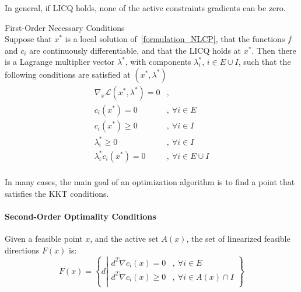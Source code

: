 In general, if LICQ holds, none of the active constraints gradients can be zero.

\begin{theorem}{First-Order Necessary Conditions}\\
\label{KKT_conditions}
  Suppose that $x^*$ is a local solution of~\ref{formulation_NLCP}, that the functions $f$ and $c_i$ are continuously differentiable, and that the LICQ holds at $x^*$.
  Then there is a Lagrange multiplier vector $\lambda^*$, with components $\lambda_i^*$, $i\in E\cup I$, such that the following conditions are satisfied at $(x^*,\lambda^*)$
  \begin{equation}
  \begin{array}{ll}
    \nabla_x\mathcal{L}(x^*,\lambda^*) = 0 &, \\
    c_i(x^*) = 0 &,\ \forall i\in E\\
    c_i(x^*) \geq 0 &,\ \forall i\in I\\
    \lambda_i^* \geq 0 &,\ \forall i\in I\\
    \lambda_i^* c_i(x^*)=0 &,\ \forall i \in E\cup I\\
  \end{array}
  \end{equation}
\end{theorem}

In many cases, the main goal of an optimization algorithm is to find a point that satisfies the KKT conditions.

\paragraph{Second-Order Optimality Conditions}

\begin{definition}
  Given a feasible point $x$, and the active set $\mathit{A}(x)$, the  set of linearized feasible directions $F(x)$ is:
  \begin{equation}
    F(x)=\left\{d\left|
        \begin{array}{ll}
          d^T\nabla c_i(x) = 0&,\ \forall i\in E \\
          d^T\nabla c_i(x) \geq 0&,\ \forall i\in \mathit{A}(x)\cap I \\
        \end{array}
        \right.
    \right\}
  \end{equation}
\end{definition}

